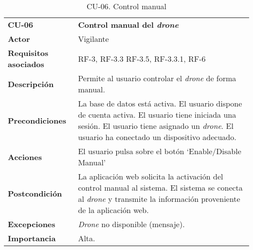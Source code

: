 \begin{table}[H]
	\begin{center}
		\begin{tabular}{m{3cm}  m{10cm}}\hline
			\toprule
			\textbf{CU-06} & \textbf{Control manual del \emph{drone}}\\
			\otoprule
			\textbf{Actor} & Vigilante\\
			\textbf{Requisitos asociados} & RF-3, RF-3.3 RF-3.5, RF-3.3.1, RF-6\\
			\textbf{Descripción} & Permite al usuario controlar el \emph{drone} de forma manual.\\
			\textbf{Precondiciones} & La base de datos está activa. El usuario dispone de cuenta activa. El usuario tiene iniciada una sesión. El usuario tiene asignado un \emph{drone}. El usuario ha conectado un dispositivo adecuado.\\
			\textbf{Acciones} & El usuario pulsa sobre el botón `Enable/Disable Manual'\\
											
			\textbf{Postcondición} & La aplicación web solicita la activación del control manual al sistema. El sistema se conecta al \emph{drone} y transmite la información proveniente de la aplicación web.\\
			\textbf{Excepciones} & \emph{Drone} no disponible (mensaje).\\
			\textbf{Importancia} & Alta.\\
			\hline
			\bottomrule
		\end{tabular}
		\caption{CU-06. Control manual}
		\label{tb:CU06}
	\end{center}
\end{table}


